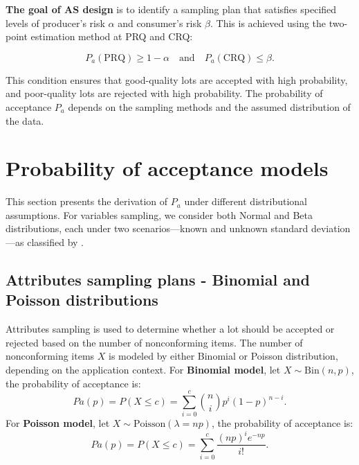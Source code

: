 \textbf{The goal of AS design} is to identify a sampling plan that satisfies
specified levels of producer's risk \(\alpha\) and consumer's risk \(\beta\).
This is achieved using the two-point estimation method at PRQ and CRQ:

\begin{equation}
P_a(\text{PRQ}) \geq 1 - \alpha \quad \text{and} \quad P_a(\text{CRQ}) \leq \beta. 
  \label{eq:balance-PR-CR-condition}
\end{equation}

This condition ensures that good-quality lots are accepted with high probability,
and poor-quality lots are rejected with high probability. The probability of
acceptance \(P_a\) depends on the sampling methods and the assumed distribution
of the data.

\section{Probability of acceptance models}\label{sec:pa_models}

This section presents the derivation of \(P_a\) under different distributional
assumptions. For variables sampling, we consider both Normal and Beta
distributions, each under two scenarios---known and unknown standard deviation---as
classified by \citet{lieberman1955matter}.

\subsection{Attributes sampling plans - Binomial and Poisson distributions}\label{attributes-sampling-plans---binomial-and-poisson-distributions}

Attributes sampling is used to determine whether a lot should be accepted or
rejected based on the number of nonconforming items.
The number of nonconforming
items \(X\) is modeled by either Binomial or Poisson distribution, depending on
the application context.
\newline
For \textbf{Binomial model}, let
\(X \sim \text{Bin}(n, p)\), the probability of acceptance is:\\
\begin{equation}
Pa(p) = P(X \leq c) = \sum_{i=0}^c \binom{n}{i} p^i (1-p)^{n-i}. 
  \label{eq:pa-binomial}
\end{equation}
For \textbf{Poisson model}, let \(X \sim \text{Poisson}(\lambda = n p)\), the
probability of acceptance is:
\begin{equation}
Pa(p) = P(X \leq c) = \sum_{i=0}^c \frac{(n p)^i e^{-n p}}{i!}. 
  \label{eq:pa-poisson}
\end{equation}

